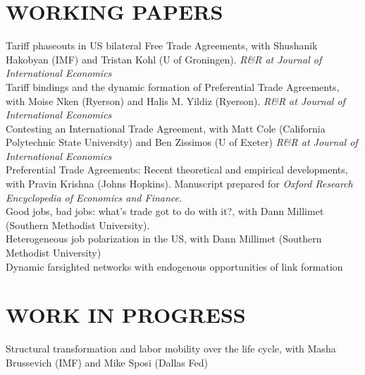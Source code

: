 \documentclass[11pt]{res}
\begin{document}
\begin{resume}
\section{WORKING PAPERS}\vspace{1.5mm}
Tariff phaseouts in US bilateral Free Trade Agreements, with Shushanik Hakobyan (IMF) and Tristan Kohl (U of Groningen). \emph{R\&R at Journal of International Economics}\vspace{1.5mm}\\
{Tariff bindings and the dynamic formation of Preferential Trade Agreements}, with Moise Nken (Ryerson) and Halis M. Yildiz (Ryerson). \emph{R\&R at Journal of International Economics}\vspace{1.5mm}\\
{Contesting an International Trade Agreement}, with Matt Cole (California Polytechnic State University) and Ben Zissimos (U of Exeter) \emph{R\&R at Journal of International Economics}\vspace{1.5mm}\\
{Preferential Trade Agreements: Recent theoretical and empirical developments}, with Pravin Krishna (Johns Hopkins). Manuscript prepared for \emph{Oxford Research Encyclopedia of Economics and Finance.}\vspace{1.5mm}\\
{Good jobs, bad jobs: what's trade got to do with it?}, with Dann Millimet (Southern Methodist University).\vspace{1.5mm}\\
{Heterogeneous job polarization in the US}, with Dann Millimet (Southern Methodist University)\vspace{1.5mm}\\
{Dynamic farsighted networks with endogenous opportunities of link formation}

\section{WORK IN PROGRESS}\vspace{1.5mm}
Structural transformation and labor mobility over the life cycle, with Masha Brussevich (IMF) and Mike Sposi (Dallas Fed)\vspace{1.5mm}\\


\end{resume}
\end{document}
